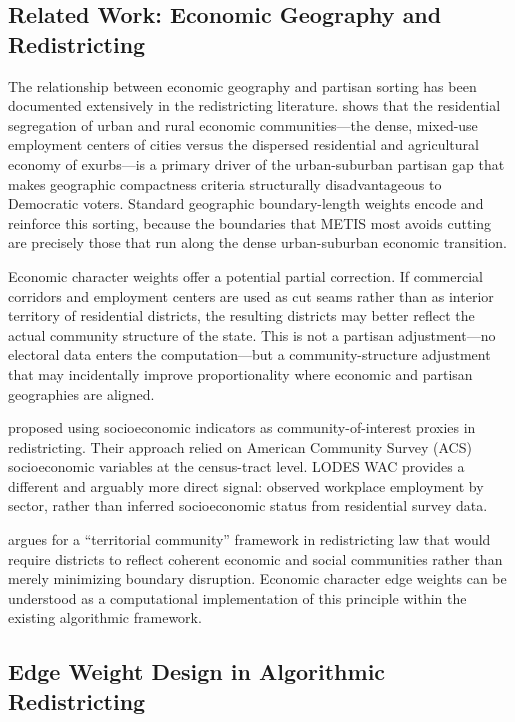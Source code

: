 \subsection{Related Work: Economic Geography and Redistricting}

The relationship between economic geography and partisan sorting has been
documented extensively in the redistricting literature.
\citet{rodden2019} shows that the residential segregation of urban and
rural economic communities---the dense, mixed-use employment centers of
cities versus the dispersed residential and agricultural economy of
exurbs---is a primary driver of the urban-suburban partisan gap that makes
geographic compactness criteria structurally disadvantageous to Democratic voters.
Standard geographic boundary-length weights encode and reinforce this
sorting, because the boundaries that METIS most avoids cutting are precisely
those that run along the dense urban-suburban economic transition.

Economic character weights offer a potential partial correction.
If commercial corridors and employment centers are used as cut seams rather
than as interior territory of residential districts, the resulting districts
may better reflect the actual community structure of the state.
This is not a partisan adjustment---no electoral data enters the
computation---but a community-structure adjustment that may incidentally
improve proportionality where economic and partisan geographies are aligned.

\citet{altman2011modeling} proposed using socioeconomic indicators as
community-of-interest proxies in redistricting.
Their approach relied on American Community Survey (ACS) socioeconomic
variables at the census-tract level.
LODES WAC provides a different and arguably more direct signal: observed
workplace employment by sector, rather than inferred socioeconomic status
from residential survey data.

\citet{stephanopoulos2012redistricting} argues for a ``territorial community''
framework in redistricting law that would require districts to reflect
coherent economic and social communities rather than merely minimizing
boundary disruption.
Economic character edge weights can be understood as a computational
implementation of this principle within the existing algorithmic framework.

\subsection{Edge Weight Design in Algorithmic Redistricting}

